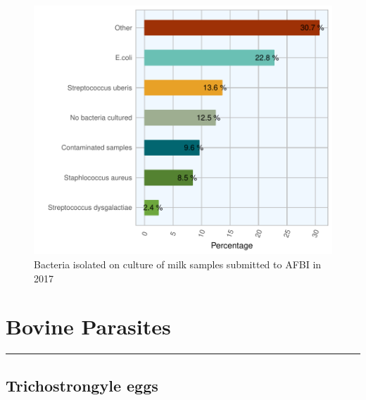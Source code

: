 \documentclass[]{book}
\begin{document}
\begin{figure}

{\centering \includegraphics{AFBI_files/figure-latex/unnamed-chunk-49-1} 

}

\caption{Bacteria isolated on culture of milk samples submitted to AFBI in 2017}\label{fig:unnamed-chunk-49}
\end{figure}

\chapter{Bovine Parasites}\label{bovine-parasites}

\begin{center}\rule{0.5\linewidth}{\linethickness}\end{center}

\section{Trichostrongyle eggs}\label{trichostrongyle-eggs}
\end{document}
